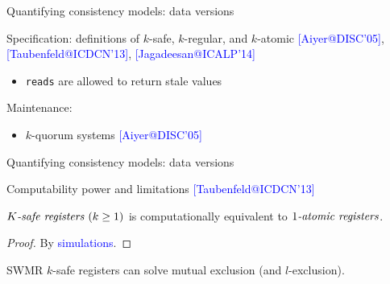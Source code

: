 \documentclass{beamer}
\makeatletter
\newcommand{\citeinbeamer}[3]{{\scriptsize{\textcolor{blue}{[#1@#2'#3]}}}}
\newcommand{\largeblue}[1]{\textcolor{blue}{\large #1}}
\makeatother
\begin{document}
\begin{frame}{Quantifying consistency models: data versions}
    \begin{block}{Specification:}
    definitions of $k$-safe, $k$-regular, and $k$-atomic
      \citeinbeamer{Aiyer}{DISC}{05}, \citeinbeamer{Taubenfeld}{ICDCN}{13},
      \citeinbeamer{Jagadeesan}{ICALP}{14}
        \begin{itemize}
          \item \texttt{reads} are allowed to return stale values
        \end{itemize}
    \end{block}

    \begin{block}{Maintenance:}
	  \begin{itemize}
		\item $k$-quorum systems \citeinbeamer{Aiyer}{DISC}{05}
	  \end{itemize}
    \end{block}
\end{frame}
\begin{frame}{Quantifying consistency models: data versions}
  \begin{block}{Computability power and limitations
  \citeinbeamer{Taubenfeld}{ICDCN}{13}}

    \begin{theorem}[]
      $K \textrm{\it -safe registers } (k \geq 1)$ is computationally
      equivalent to $1 \textrm{\it -atomic registers}$.
    \end{theorem}

    \begin{proof}
      By \largeblue{simulations}.
    \end{proof}

    \begin{theorem}[]
      SWMR $k$-safe registers can solve mutual exclusion (and $l$-exclusion).
    \end{theorem}
  \end{block}
\end{frame}

\end{document}
